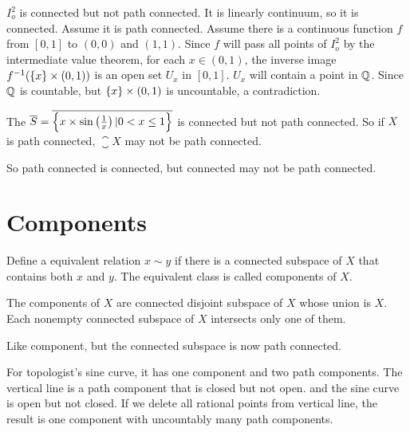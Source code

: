 \begin{example}
    $I_o^2$ is connected but not path connected. It is linearly continuum, so it is connected. Assume it is path connected. Assume there is a continuous function $f$ from $[0,1]$ to $(0,0)$ and $(1,1)$. Since $f$ will pass all points of $I_o^2$ by the intermediate value theorem, for each $x \in (0,1)$, the inverse image ${f}^{-1}(\set{x} \times (0,1))$ is an open set $U_x$ in $[0,1]$. $U_x$ will contain a point in $\mathbb{Q}$. Since $\mathbb{Q}$ is countable, but $\set{x} \times (0,1)$ is uncountable, a contradiction.
\end{example}

\begin{example}
    The  $\overline{S} = \overline{\set{x \times \sin \left(\frac{1}{x} \right) | 0 < x \leq 1}}$ is connected but not path connected. So if $X$ is path connected, $\closure{X}$ may not be path connected.
    
    So path connected is connected, but connected may not be path connected.
\end{example}





\section{Components}

\begin{definition}
    Define a equivalent relation $x \sim y$ if there is a connected subspace of $X$ that contains both $x$ and $y$. The equivalent class is called components of $X$.
\end{definition}

\begin{theorem}
The components of $X$ are connected disjoint subspace of $X$ whose union is $X$. Each nonempty connected subspace of $X$ intersects only one of them.    
\end{theorem}




\begin{definition}
    Like component, but the connected subspace is now path connected.
\end{definition}

\begin{example}
    For topologist's sine curve, it has one component and two path components. The vertical line is a path component that is closed but not open. and the sine curve is open but not closed. If we delete all rational points from vertical line, the result is one component with uncountably many path components.    
\end{example}



